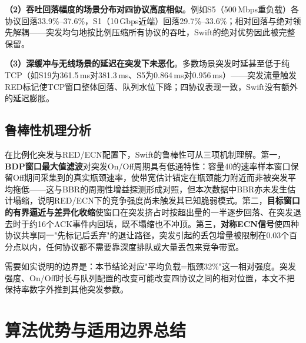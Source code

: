 \textbf{（2）吞吐回落幅度的场景分布对四协议高度相似}。例如S5（500\,Mbps重负载）各协议回落33.9\%--37.6\%，S1（10\,Gbps近端）回落29.7\%--33.6\%；相对回落与绝对领先解耦——突发均匀地按比例压缩所有协议的吞吐，Swift的绝对优势因此被完整保留。

\textbf{（3）深缓冲与无线场景的延迟在突发下未恶化}。多数场景突发时延甚至低于纯TCP（如S19为361.5\,ms对381.3\,ms、S5为0.864\,ms对0.956\,ms）——突发流量触发RED标记使TCP窗口整体回落、队列水位下降；四协议表现一致，Swift没有额外的延迟膨胀。

\subsection{鲁棒性机理分析}

在比例化突发与RED/ECN配置下，Swift的鲁棒性可从三项机制理解。第一，\textbf{BDP窗口最大值滤波}对突发On/Off周期具有低通特性：容量40的速率样本窗口保留Off期间采集到的真实瓶颈速率，使带宽估计锚定在瓶颈能力附近而非被突发平均拖低——这与BBR的周期性增益探测形成对照，但本次数据中BBR亦未发生估计塌缩，说明RED/ECN下的竞争强度尚未触发其已知脆弱模式。第二，\textbf{目标窗口的有界逼近与差异化收缩}使窗口在突发挤占时按超出量的一半逐步回落、在突发退去时于约16个ACK事件内回填，既不塌缩也不冲顶。第三，\textbf{对称ECN信号}使四种协议共享同一"先标记后丢弃"的退让路径，突发引起的丢包增量被限制在0.03个百分点以内，任何协议都不需要靠深度排队或大量丢包来竞争带宽。

需要如实说明的边界是：本节结论对应"平均负载=瓶颈32\%"这一相对强度。突发强度、On/Off时长与队列配置的改变可能改变四协议之间的相对位置，本文不把保持率数字外推到其他突发参数。

\section{算法优势与适用边界总结}


